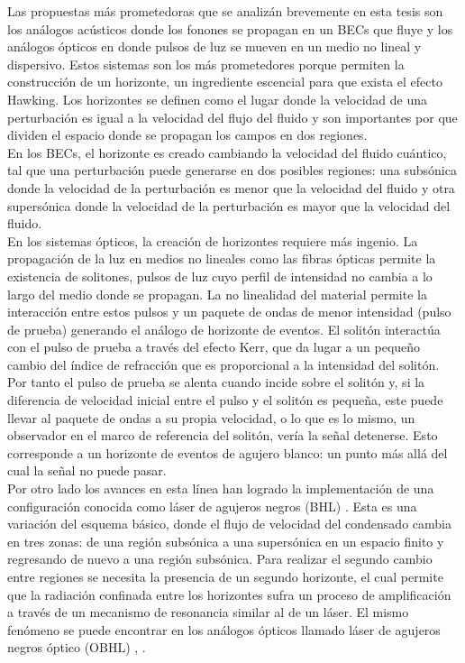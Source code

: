 Las propuestas m\'{a}s prometedoras que se analiz\'{a}n brevemente en esta tesis son los an\'{a}logos ac\'{u}sticos donde los fonones se propagan en un BECs que fluye y los an\'{a}logos \'{o}pticos en donde pulsos de luz se mueven en un medio no lineal y dispersivo. Estos sistemas son los m\'{a}s prometedores porque permiten la construcci\'{o}n de un horizonte, un ingrediente escencial para que exista el efecto Hawking. Los horizontes se definen como el lugar donde la velocidad de una perturbaci\'{o}n es igual a la velocidad del flujo del fluido y son importantes por que dividen el espacio donde se propagan los campos en dos regiones.\\

En los BECs, el horizonte es creado cambiando la velocidad del fluido cu\'{a}ntico, tal que una perturbaci\'{o}n puede generarse en dos posibles regiones: una subs\'{o}nica donde la velocidad de la perturbaci\'{o}n es menor que la velocidad del fluido y otra supers\'{o}nica donde la velocidad de la perturbaci\'{o}n es mayor que la velocidad del fluido.\\

En los sistemas \'{o}pticos, la creaci\'{o}n de horizontes requiere m\'{a}s ingenio. La propagaci\'{o}n de la luz en medios no lineales como las fibras \'{o}pticas permite la existencia de solitones, pulsos de luz cuyo perfil de intensidad no cambia a lo largo del medio donde se propagan. La no linealidad del material permite la interacción entre estos pulsos y un paquete de ondas de menor intensidad (pulso de prueba) generando el análogo de horizonte de eventos. El solit\'{o}n interactúa con el pulso de prueba a trav\'{e}s del efecto Kerr, que da lugar a un peque\~{n}o cambio del \'{i}ndice de refracci\'{o}n que es proporcional a la intensidad del solit\'{o}n. Por tanto el pulso de prueba se alenta cuando incide sobre el solit\'{o}n y, si la diferencia de velocidad inicial entre el pulso y el solit\'{o}n es pequeña, este puede llevar al paquete de ondas a su propia velocidad, o lo que es lo mismo, un observador en el marco de referencia del solit\'{o}n, ver\'{i}a la se\~{n}al detenerse. Esto corresponde a un horizonte de eventos de agujero blanco: un punto más allá del cual la se\~{n}al no puede pasar.\\

Por otro lado los avances en esta línea han logrado la implementación de una configuración conocida como láser de agujeros negros (BHL) \citep{Corley1996}. Esta es una variaci\'{o}n del esquema básico, donde  el flujo de velocidad del condensado cambia en tres zonas: de una regi\'{o}n subs\'{o}nica a una supers\'{o}nica en un espacio finito y regresando de nuevo a una regi\'{o}n subs\'{o}nica. Para realizar el segundo cambio entre regiones se necesita la presencia de un segundo horizonte, el cual permite que la radiaci\'{o}n confinada entre los horizontes sufra un proceso de amplificaci\'{o}n a través de un mecanismo de resonancia similar al de un láser. El mismo fen\'{o}meno se puede encontrar en los an\'{a}logos \'{o}pticos llamado l\'{a}ser  de agujeros negros \'{o}ptico (OBHL)  \citep{Faccio2012}, \citep{GaonaReyes2017}.\\

